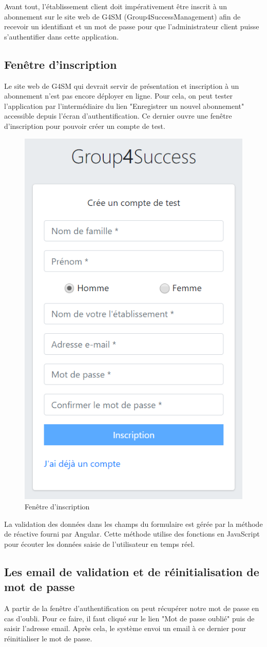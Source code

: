 Avant tout, l'établissement client doit impérativement être inscrit à un abonnement sur le site web de G4SM (Group4SuccessManagement) afin de recevoir un identifiant et un mot de passe pour que l’administrateur client puisse s'authentifier dans cette application.
\clearpage

\subsection{Fenêtre d'inscription}
Le site web de G4SM qui devrait servir de présentation et inscription à un abonnement n'est pas encore déployer en ligne. Pour cela, on peut tester l'application par l'intermédiaire du lien "Enregistrer un nouvel abonnement" accessible depuis l'écran d'authentification. Ce dernier ouvre une fenêtre d'inscription pour pouvoir créer un compte de test.

\begin{figure}[h]
	\centering
	\includegraphics[width=0.55\linewidth]{"Chapitre5/images/inscription"}
	\caption{Fenêtre d'inscription}
	\label{Fenêtre d'inscription}
\end{figure}

La validation des données dans les champs du formulaire est gérée par la méthode de réactive fourni par Angular. Cette méthode utilise des fonctions en JavaScript pour écouter les données saisie de l'utilisateur en temps réel.
\clearpage

\subsection{Les email de validation et de réinitialisation de mot de passe}
A partir de la fenêtre d'authentification on peut récupérer notre mot de passe en cas d'oubli. Pour ce faire, il faut cliqué sur le lien "Mot de passe oublié" puis de saisir l'adresse email. Après cela, le système envoi un email à ce dernier pour réinitialiser le mot de passe.
\medskip

